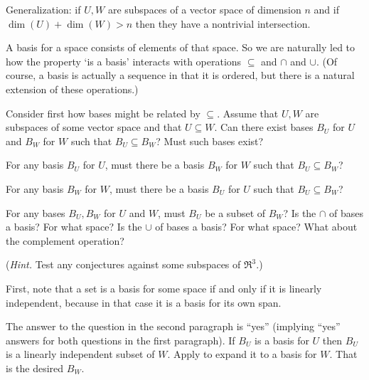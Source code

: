 \begin{exercises}
\begin{answer}
       Generalization:
       if \( U,W \) are subspaces of a vector space of dimension \( n \) and
       if \( \dim(U)+\dim(W)>n \) then they have a nontrivial
       intersection.  
    \end{answer}
  \item 
    A basis for a space consists of elements of that space.
    So we are naturally led to how the property `is a basis' 
    interacts with operations $\subseteq$ and $\cap$ and $\cup$.
    (Of course, a basis is actually a sequence in that it is ordered, 
    but there is a natural extension of these operations.)
    \begin{exparts}
      \partsitem Consider first how bases might be related by $\subseteq$.
        Assume that \( U,W \) are subspaces of some vector space and
        that \( U\subseteq W \).
        Can there exist bases \( B_U \) for \( U \) and \( B_W \) for \( W \)
        such that \( B_U\subseteq B_W \)?
        Must such bases exist?

        For any basis \( B_U \) for \( U \), must there be a basis \( B_W \)
        for \( W \) such that \( B_U\subseteq B_W \)?

        For any basis \( B_W \) for \( W \), must there be a basis \( B_U \)
        for \( U \) such that \( B_U\subseteq B_W \)?

        For any bases \( B_U, B_W \) for \( U \) and \( W \), must  \( B_U \)
        be a subset of \( B_W \)?
      \partsitem Is the $\cap$ of bases a basis?
        For what space?
      \partsitem Is the $\cup$ of bases a basis?
        For what space?
      \partsitem What about the complement operation?
     \end{exparts}
     (\textit{Hint.} 
     Test any conjectures against some subspaces of \( \Re^3 \).)
     \begin{answer}
       First, note that a set is a basis for some space if and only
       if it is linearly independent, because in that case 
       it is a basis for its own span.
       \begin{exparts}
         \partsitem The answer to the question in the second paragraph
            is ``yes''
           (implying ``yes'' answers for both questions in the first
           paragraph).
           If \( B_U \) is a basis for \( U \) then
           \( B_U \) is a linearly independent subset of \( W \).
           Apply  to expand it to a basis for 
           \( W \).
           That is the desired \( B_W \).


\end{exparts}
\end{answer}
\end{exercises}
